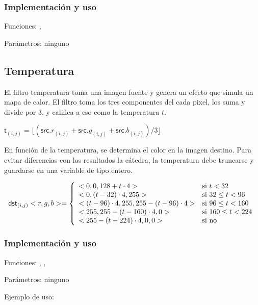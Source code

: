 \subsubsection*{Implementación y uso}

\noindent Funciones: , 

\noindent Parámetros: ninguno





\subsection{Temperatura}

    El filtro temperatura toma una imagen fuente y genera un
    efecto que simula un mapa de calor. El filtro toma
    los tres componentes del cada pixel, los suma y divide por 3, y califica a eso
    como la temperatura $t$.

    \begin{center}
    $\mathsf{t}_{(i,j)} = \lfloor(\mathsf{src}.r_{(i,j)} + \mathsf{src}.g_{(i,j)} + \mathsf{src}.b_{(i,j)}) / 3\rfloor$
	\end{center}
    
    En función de la temperatura, se determina el color en la imagen destino. 
    Para evitar diferencias con los resultados la cátedra, la 
    temperatura debe truncarse y guardarse en una variable de tipo entero.

    \begin{center}
	\begin{displaymath}
	\mathsf{dst}_{(i,j)}<r,g,b> = \left\{
	\begin{array}{l l}
				<0,0, 128 + t \cdot 4> & \text{si }t < 32\\
				<0, (t - 32) \cdot 4, 255> & \text{si }32 \le t < 96\\
				<(t-96) \cdot 4, 255, 255 - (t-96) \cdot 4> & \text{si }96 \le t < 160\\
				<255, 255 - (t - 160) \cdot 4, 0> & \text{si }160 \le t < 224\\
				<255 - (t - 224) \cdot 4, 0 , 0> & \text{si no} \\
	\end{array}
	\right.
	\end{displaymath}
	\end{center}
	
    \newpage




\subsubsection*{Implementación y uso}

\noindent Funciones: , ,

\noindent Parámetros: ninguno

\noindent Ejemplo de uso: 


